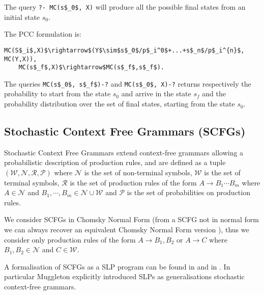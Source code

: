 \documentclass[letterpaper]{article}
\theoremstyle{plain}
\theoremstyle{definition}
\theoremstyle{remark}
\theoremstyle{definition}
\begin{document}
The query \lstinline[mathescape=true]{?- MC(s$_0$, X)}
will produce all the possible final states from an initial state $s_0$.

The PCC formulation is:
\begin{lstlisting}[mathescape=true]
MC(S$_i$,X)$\rightarrow$(Y$\sim$s$_0$/p$_i^0$+...+s$_n$/p$_i^{n}$, MC(Y,X)),
	MC(s$_f$,X)$\rightarrow$MC(s$_f$,s$_f$).
\end{lstlisting}
The queries \lstinline[mathescape=true]{MC(s$_0$, s$_f$)-?} and \lstinline[mathescape=true]{MC(s$_0$, X)-?} returns respectively the probability to start from the state $s_0$ and arrive in the state $s_f$ and the probability distribution over the set of final states, starting from the state $s_0$.




\subsection{Stochastic Context Free Grammars (SCFGs)}
Stochastic Context Free Grammars \cite{SCFG_1,SCFG_2} extend context-free grammars allowing a probabilistic description of production rules, and are defined as a tuple $(\mathcal{W},\mathcal{N},\mathcal{R},\mathcal{P})$
where
$\mathcal{N}$ is the set of non-terminal symbols,
$\mathcal{W}$ is the set of terminal symbols,
$\mathcal{R}$ is the set of production rules of the form $A \rightarrow B_1 \cdots B_m$ where $A \in \mathcal{N}$ and  $B_1 , \cdots , B_m \in  \mathcal{N} \cup \mathcal{W}$ and 
$\mathcal{P}$ is the set of probabilities on production rules.

We consider SCFGs in Chomsky Normal Form (from a SCFG not in normal form we can always recover an equivalent Chomsky Normal Form version \cite{chomsky56}), thus we consider only production rules of the form  $A \rightarrow B_1, B_2$ or  $A \rightarrow C$ where $B_1,B_2 \in \mathcal{N}$ and $C \in \mathcal{W}$.

A formalisation of SCFGs as a SLP program can be found in \cite{SLPmuggleton96} and in \cite{SLPcussens2001}.
In particular Muggleton \cite{SLPmuggleton96} explicitly introduced SLPs as generalisations stochastic context-free grammars.
\end{document}
